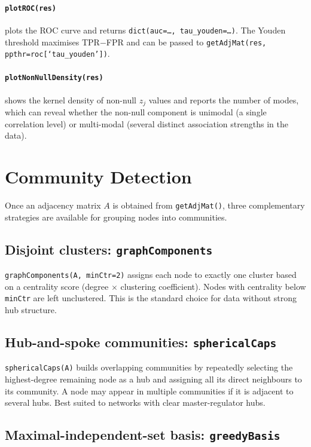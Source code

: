 \documentclass[a4paper,10pt]{article}
\begin{document}
\paragraph{\texttt{plotROC(res)}} plots the ROC curve and returns \texttt{dict(auc=\ldots, tau\_youden=\ldots)}.  The Youden threshold maximises TPR$-$FPR and can be passed to \texttt{getAdjMat(res, ppthr=roc[`tau\_youden'])}.

\paragraph{\texttt{plotNonNullDensity(res)}} shows the kernel density of non-null $z_j$ values and reports the number of modes, which can reveal whether the non-null component is unimodal (a single correlation level) or multi-modal (several distinct association strengths in the data).


\section{Community Detection}

Once an adjacency matrix $A$ is obtained from \texttt{getAdjMat()}, three complementary strategies are available for grouping nodes into communities.

\subsection{Disjoint clusters: \texttt{graphComponents}}

\texttt{graphComponents(A, minCtr=2)} assigns each node to exactly one cluster based on a centrality score (degree $\times$ clustering coefficient).  Nodes with centrality below \texttt{minCtr} are left unclustered.  This is the standard choice for data without strong hub structure.

\subsection{Hub-and-spoke communities: \texttt{sphericalCaps}}

\texttt{sphericalCaps(A)} builds overlapping communities by repeatedly selecting the highest-degree remaining node as a hub and assigning all its direct neighbours to its community.  A node may appear in multiple communities if it is adjacent to several hubs.  Best suited to networks with clear master-regulator hubs.

\subsection{Maximal-independent-set basis: \texttt{greedyBasis}}
\end{document}
